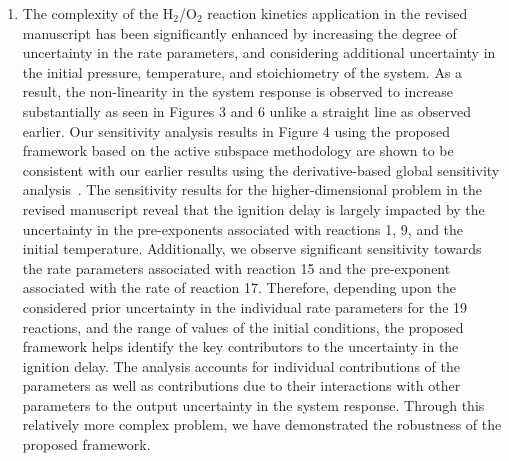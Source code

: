 \documentclass[11pt,final]{article}
\newcommand{\referee}[1]{\vspace{.1ex}\noindent{\textcolor{blue}{#1}}}
\begin{document}
\begin{enumerate}[wide, labelwidth=!, labelindent=0pt]
\item \referee{The authors find that the uncertainty in the ignition delay time is governed
by the uncertainty in H+O~2$<$=$>$~O+OH.
The connection between this reaction and the ignition delay time is so overwhelming that it
is probably responsible for the 1-dimensional active subspace reduction. Once the sensitivity
indices are computed, the one associated with this key reaction is largest.
To a combustion scientist, the fact that ignition delay time (and the uncertainty in the 
ignition delay time when pre-exponentials or activation energies are changed) is governed 
by H+O2~$<$=$>$~O+OH is obvious. This is THE key reaction in combustion kinetics with 10s 
(if not 100s) of studies dedicated to it (from the beginning of the field…). This is textbook k knowledge.
E.g. Figure 4 in Hong et al. (PCI 33, 2011, p. 309-316) shows that, indeed, this is the key 
reaction in sensitivity (by a large margin…). That figure is a "sensitivity analysis" 
which one can accomplish easily.
So, if this is the case, is the authors' reduction framework working because the nonlinear system
is really "simple" in its response to varying parameters}

The complexity of the H$_2$/O$_2$ reaction kinetics application in the revised manuscript has been significantly
enhanced by increasing the degree of uncertainty in the rate parameters, and considering additional 
uncertainty in the
initial pressure, temperature, and stoichiometry of the system. As a result, the non-linearity in the system
response is observed to increase substantially as seen in Figures 3 and 6 unlike a straight line as 
observed earlier. Our sensitivity analysis results in Figure 4 using the proposed framework based on the
active subspace methodology are shown to be consistent with our earlier results using the derivative-based
global sensitivity analysis~\cite{Vohra:2018}. The sensitivity results for the higher-dimensional problem in the
revised manuscript reveal that the ignition delay is largely impacted by
the uncertainty in the pre-exponents associated with reactions 1, 9, and the initial temperature. Additionally,
we observe significant sensitivity towards the rate parameters associated with reaction 15 and the pre-exponent
associated with the rate of reaction 17. 
Therefore, depending upon the considered prior uncertainty in the individual rate parameters for the 19
reactions, and the range of values of the initial conditions, the proposed framework helps identify the
key contributors to the uncertainty in the ignition delay. The analysis accounts for individual 
contributions of the parameters as well as contributions due to their interactions with other parameters to the 
output uncertainty in the system response. Through this relatively more complex
problem, we have demonstrated the robustness of the proposed framework. 


\end{enumerate}
\end{document}
